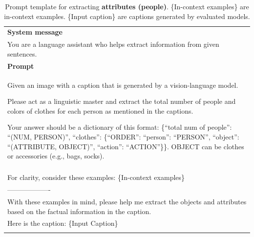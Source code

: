 \begin{table}[h!]\centering
\begin{minipage}{0.95\textwidth}  
\centering
\begin{tcolorbox} 
    \centering
    \small
    \begin{tabular}{p{}}
   { {\bf System message} } \\
    You are a language assistant who helps extract information from given sentences. \\
    \midrule
    {\bf Prompt}  \\
    Given an image with a caption that is generated by a vision-language model.
    
    Please act as a linguistic master and extract the total number of people and colors of clothes for each person as mentioned in the captions.
    
    Your answer should be a dictionary of this format: \{``total num of people'': ``(NUM, PERSON)'', ``clothes'': \{``ORDER'': ``person'': ``PERSON'', ``object'': ``(ATTRIBUTE, OBJECT)'', ``action'': ``ACTION''\}\}. OBJECT can be clothes or accessories (e.g., bags, socks). \\\\

    For clarity, consider these examples: \textcolor[rgb]{0,0.7,0}{ \{In-context examples\} } \\
------------------- \\
        With these examples in mind, please help me extract the objects and attributes based on the factual information in the caption. \\
        Here is the caption: 
\textcolor[rgb]{0.8,0,0}{\{Input Caption\}} \\
\\

    \end{tabular}
\end{tcolorbox}
\caption{Prompt template for extracting \textbf{attributes (people)}. \textcolor[rgb]{0,0.7,0}{ \{In-context examples\} } are in-context examples. \textcolor[rgb]{0.8,0,0}{\{Input caption\}} are captions generated by evaluated models.}
    \label{tab:extraction_att_peo}
\end{minipage}
\end{table}

